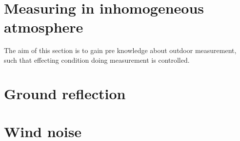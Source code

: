\section{Measuring in inhomogeneous atmosphere}
The aim of this section is to gain pre knowledge about outdoor measurement, such that effecting condition doing measurement is controlled. 

\section{Ground reflection}

\section{Wind noise}\label{pre:wind_noise}



 